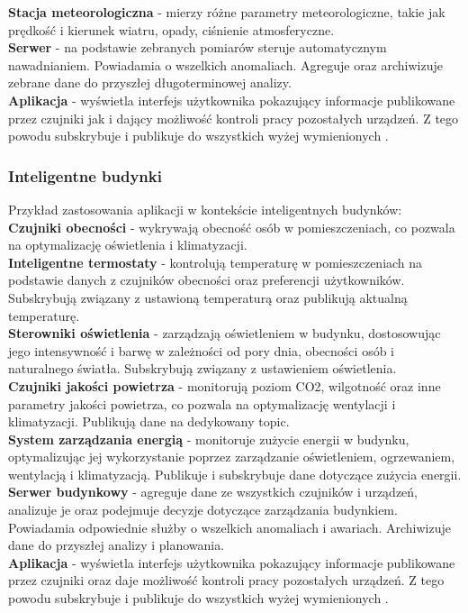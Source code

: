 \textbf{Stacja meteorologiczna} - mierzy różne parametry meteorologiczne, takie jak prędkość i kierunek wiatru, opady, ciśnienie atmosferyczne.\\

\textbf{Serwer} - na podstawie zebranych pomiarów steruje automatycznym nawadnianiem. Powiadamia o wszelkich anomaliach. Agreguje oraz archiwizuje zebrane dane do przyszłej długoterminowej analizy.\\

\textbf{Aplikacja} - wyświetla interfejs użytkownika pokazujący informacje publikowane przez czujniki jak i dający możliwość kontroli pracy pozostałych urządzeń. Z tego powodu subskrybuje i publikuje do wszystkich wyżej wymienionych .\\

\newpage

\subsubsection{Inteligentne budynki}
Przykład zastosowania aplikacji w kontekście inteligentnych budynków:\\

\textbf{Czujniki obecności} - wykrywają obecność osób w pomieszczeniach, co pozwala na optymalizację oświetlenia i klimatyzacji.\\

\textbf{Inteligentne termostaty} - kontrolują temperaturę w pomieszczeniach na podstawie danych z czujników obecności oraz preferencji użytkowników. Subskrybują  związany z ustawioną temperaturą oraz publikują aktualną temperaturę.\\

\textbf{Sterowniki oświetlenia} - zarządzają oświetleniem w budynku, dostosowując jego intensywność i barwę w zależności od pory dnia, obecności osób i naturalnego światła. Subskrybują  związany z ustawieniem oświetlenia.\\

\textbf{Czujniki jakości powietrza} - monitorują poziom CO2, wilgotność oraz inne parametry jakości powietrza, co pozwala na optymalizację wentylacji i klimatyzacji. Publikują dane na dedykowany topic.\\

\textbf{System zarządzania energią} - monitoruje zużycie energii w budynku, optymalizując jej wykorzystanie poprzez zarządzanie oświetleniem, ogrzewaniem, wentylacją i klimatyzacją. Publikuje i subskrybuje dane dotyczące zużycia energii.\\

\textbf{Serwer budynkowy} - agreguje dane ze wszystkich czujników i urządzeń, analizuje je oraz podejmuje decyzje dotyczące zarządzania budynkiem. Powiadamia odpowiednie służby o wszelkich anomaliach i awariach. Archiwizuje dane do przyszłej analizy i planowania.\\

\textbf{Aplikacja} - wyświetla interfejs użytkownika pokazujący informacje publikowane przez czujniki oraz daje możliwość kontroli pracy pozostałych urządzeń. Z tego powodu subskrybuje i publikuje do wszystkich wyżej wymienionych .\\